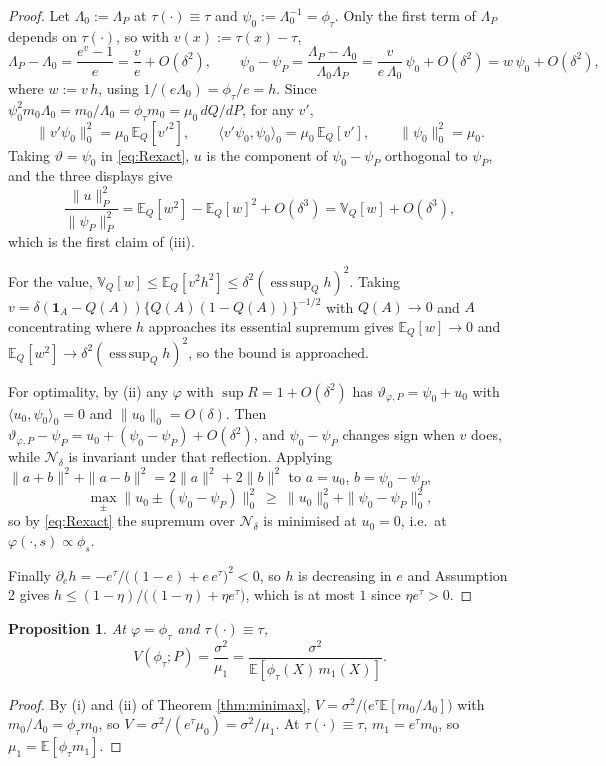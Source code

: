 \documentclass{article}
\newtheorem{proposition}[theorem]{Proposition}
\begin{document}
\begin{proof}
Let $\Lambda_0:=\Lambda_P$ at $\tau(\cdot)\equiv\tau$ and $\psi_0:=\Lambda_0^{-1}=\phi_\tau$.  Only the first term of $\Lambda_P$ depends on $\tau(\cdot)$, so with $v(x):=\tau(x)-\tau$,
\[
  \Lambda_P-\Lambda_0=\frac{e^{v}-1}{e}=\frac{v}{e}+O(\delta^2),
  \qquad
  \psi_0-\psi_P=\frac{\Lambda_P-\Lambda_0}{\Lambda_0\Lambda_P}
  =\frac{v}{e\,\Lambda_0}\,\psi_0+O(\delta^2)
  =w\,\psi_0+O(\delta^2),
\]
where $w:=v\,h$, using $1/(e\Lambda_0)=\phi_\tau/e=h$.  Since $\psi_0^2m_0\Lambda_0=m_0/\Lambda_0=\phi_\tau m_0=\mu_0\,dQ/dP$, for any $v'$,
\[
  \|v'\psi_0\|_0^2=\mu_0\,\mathbb{E}_Q[v'^2],
  \qquad
  \langle v'\psi_0,\psi_0\rangle_0=\mu_0\,\mathbb{E}_Q[v'],
  \qquad
  \|\psi_0\|_0^2=\mu_0 .
\]
Taking $\vartheta=\psi_0$ in \eqref{eq:Rexact}, $u$ is the component of $\psi_0-\psi_P$ orthogonal to $\psi_P$, and the three displays give
\[
  \frac{\|u\|_P^2}{\|\psi_P\|_P^2}=\mathbb{E}_Q[w^2]-\mathbb{E}_Q[w]^2+O(\delta^3)=\mathbb{V}_Q[w]+O(\delta^3),
\]
which is the first claim of (iii).

For the value, $\mathbb{V}_Q[w]\le\mathbb{E}_Q[v^2h^2]\le\delta^2(\operatorname*{ess\,sup}_Qh)^2$.  Taking $v=\delta(\mathbf{1}_A-Q(A))\{Q(A)(1-Q(A))\}^{-1/2}$ with $Q(A)\to0$ and $A$ concentrating where $h$ approaches its essential supremum gives $\mathbb{E}_Q[w]\to0$ and $\mathbb{E}_Q[w^2]\to\delta^2(\operatorname*{ess\,sup}_Qh)^2$, so the bound is approached.

For optimality, by (ii) any $\varphi$ with $\sup R=1+O(\delta^2)$ has $\vartheta_{\varphi,P}=\psi_0+u_0$ with $\langle u_0,\psi_0\rangle_0=0$ and $\|u_0\|_0=O(\delta)$.  Then $\vartheta_{\varphi,P}-\psi_P=u_0+(\psi_0-\psi_P)+O(\delta^2)$, and $\psi_0-\psi_P$ changes sign when $v$ does, while $\mathcal{N}_\delta$ is invariant under that reflection.  Applying $\|a+b\|^2+\|a-b\|^2=2\|a\|^2+2\|b\|^2$ to $a=u_0$, $b=\psi_0-\psi_P$,
\[
  \max_\pm\bigl\|u_0\pm(\psi_0-\psi_P)\bigr\|_0^2\ \ge\ \|u_0\|_0^2+\|\psi_0-\psi_P\|_0^2,
\]
so by \eqref{eq:Rexact} the supremum over $\mathcal{N}_\delta$ is minimised at $u_0=0$, i.e.\ at $\varphi(\cdot,s)\propto\phi_s$.

Finally $\partial_e h=-e^{\tau}/\bigl((1-e)+e\,e^{\tau}\bigr)^2<0$, so $h$ is decreasing in $e$ and Assumption 2 gives $h\le(1-\eta)/\bigl((1-\eta)+\eta e^{\tau}\bigr)$, which is at most $1$ since $\eta e^{\tau}>0$.
\end{proof}

\begin{proposition}
At $\varphi=\phi_\tau$ and $\tau(\cdot)\equiv\tau$,
\[
  V(\phi_\tau;P)=\frac{\sigma^2}{\mu_1}=\frac{\sigma^2}{\mathbb{E}[\phi_\tau(X)\,m_1(X)]} .
\]
\end{proposition}

\begin{proof}
By (i) and (ii) of Theorem \ref{thm:minimax}, $V=\sigma^2/\bigl(e^{\tau}\mathbb{E}[m_0/\Lambda_0]\bigr)$ with $m_0/\Lambda_0=\phi_\tau m_0$, so $V=\sigma^2/(e^{\tau}\mu_0)=\sigma^2/\mu_1$.  At $\tau(\cdot)\equiv\tau$, $m_1=e^{\tau}m_0$, so $\mu_1=\mathbb{E}[\phi_\tau m_1]$.
\end{proof}
\end{document}
